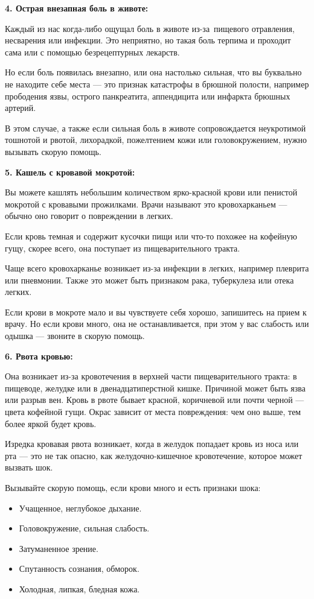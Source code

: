 \documentclass[a4paper, 12pt]{article}
\theoremstyle{definition}
\begin{document}
        \textbf{4. Острая внезапная боль в животе:}
        
        Каждый из нас когда-либо ощущал боль в животе из-за пищевого отравления, несварения или инфекции. Это неприятно, но такая боль терпима и проходит сама или с помощью безрецептурных лекарств.
        
        Но если боль появилась внезапно, или она настолько сильная, что вы буквально не находите себе места — это признак катастрофы в брюшной полости, например прободения язвы, острого панкреатита, аппендицита или инфаркта брюшных артерий.
        
        В этом случае, а также если сильная боль в животе сопровождается неукротимой тошнотой и рвотой, лихорадкой, пожелтением кожи или головокружением, нужно вызывать скорую помощь.

        \textbf{5. Кашель с кровавой мокротой:}

        Вы можете кашлять небольшим количеством ярко-красной крови или пенистой мокротой с кровавыми прожилками. Врачи называют это кровохарканьем — обычно оно говорит о повреждении в легких.
    
        Если кровь темная и содержит кусочки пищи или что-то похожее на кофейную гущу, скорее всего, она поступает из пищеварительного тракта. 

        Чаще всего кровохарканье возникает из-за инфекции в легких, например плеврита или пневмонии. Также это может быть признаком рака, туберкулеза или отека легких.

        Если крови в мокроте мало и вы чувствуете себя хорошо, запишитесь на прием к врачу. Но если крови много, она не останавливается, при этом у вас слабость или одышка — звоните в скорую помощь. 

        \textbf{6. Рвота кровью:}
        
        Она возникает из-за кровотечения в верхней части пищеварительного тракта: в пищеводе, желудке или в двенадцатиперстной кишке. Причиной может быть язва или разрыв вен. Кровь в рвоте бывает красной, коричневой или почти черной — цвета кофейной гущи. Окрас зависит от места повреждения: чем оно выше, тем более яркой будет кровь.

        Изредка кровавая рвота возникает, когда в желудок попадает кровь из носа или рта — это не так опасно, как желудочно-кишечное кровотечение, которое может вызвать шок.

        Вызывайте скорую помощь, если крови много и есть признаки шока:
        \begin{itemize}
            \item Учащенное, неглубокое дыхание.
            \item Головокружение, сильная слабость.
            \item Затуманенное зрение.
            \item Спутанность сознания, обморок.
            \item Холодная, липкая, бледная кожа.
        \end{itemize}
\end{document}
